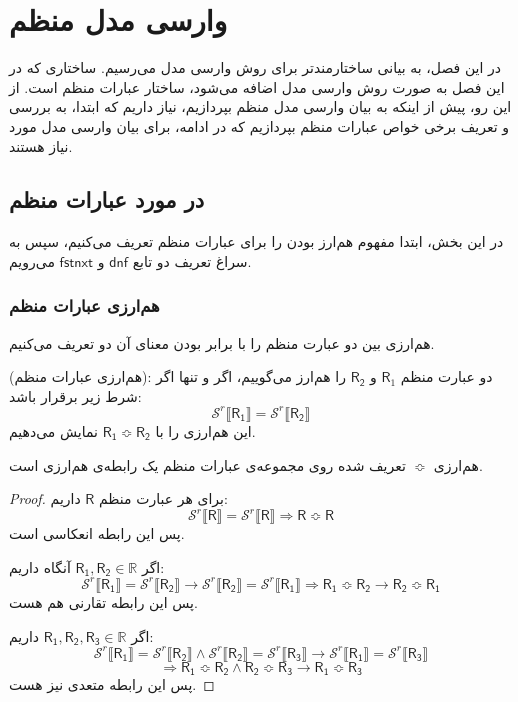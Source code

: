 \chapter{وارسی مدل منظم}
در این فصل، به بیانی ساختارمندتر برای روش وارسی مدل می‌رسیم. ساختاری که در این فصل به صورت روش وارسی مدل اضافه می‌شود، ساختار عبارات منظم است. از این رو، پیش از اینکه به بیان وارسی مدل منظم بپردازیم، نیاز داریم که ابتدا، به بررسی و تعریف برخی خواص عبارات منظم بپردازیم که در ادامه، برای بیان وارسی مدل مورد نیاز هستند.

\section{در مورد عبارات منظم}
در این بخش، ابتدا مفهوم هم‌ارز بودن را برای عبارات منظم تعریف می‌کنیم، سپس به سراغ تعریف دو تابع 
$\mathsf{dnf}$
و 
$\mathsf{fstnxt}$
می‌رویم. 
\subsection{هم‌ارزی عبارات منظم}
‌هم‌ارزی بین دو عبارت منظم را با برابر بودن معنای آن دو تعریف می‌کنیم.
\begin{defn}
	(هم‌ارزی عبارات منظم):
	دو عبارت منظم
	$\mathsf{R}_1$
	و
	$\mathsf{R_2}$
	 را هم‌ارز می‌گوییم، اگر و تنها اگر شرط زیر برقرار باشد:
	 $$\mathcal{S}^r \llbracket \mathsf{R_1} \rrbracket = \mathcal{S}^r \llbracket \mathsf{R_2} \rrbracket$$ 
	 این هم‌ارزی را با 
	 $\mathsf{R_1} \Bumpeq \mathsf{R_2}$
	 نمایش می‌دهیم.
\end{defn}

\begin{thm}
	هم‌ارزی $\Bumpeq$ تعریف شده روی مجموعه‌ی عبارات منظم یک رابطه‌ی هم‌ارزی است.
\end{thm}
\begin{proof}
	برای هر عبارت منظم $\mathsf{R}$ داریم:
	$$\mathcal{S}^r \llbracket \mathsf{R} \rrbracket = 
	\mathcal{S}^r \llbracket \mathsf{R} \rrbracket \Rightarrow
	\mathsf{R} \Bumpeq \mathsf{R}$$
	پس این رابطه انعکاسی است.
	
	اگر 
	$\mathsf{R_1 , R_2} \in \mathbb{R}$
	آنگاه داریم:
	$$\mathcal{S}^r \llbracket \mathsf{R_1} \rrbracket =
	\mathcal{S}^r \llbracket \mathsf{R_2} \rrbracket \rightarrow
	\mathcal{S}^r \llbracket \mathsf{R_2} \rrbracket =
	\mathcal{S}^r \llbracket \mathsf{R_1} \rrbracket \Rightarrow
	\mathsf{R_1} \Bumpeq \mathsf{R_2} \rightarrow
	\mathsf{R_2} \Bumpeq \mathsf{R_1}$$
	پس این رابطه تقارنی هم هست.
	
	اگر
	 $\mathsf{R_1,R_2,R_3} \in \mathbb{R}$
	 	داریم:
	 $$\mathcal{S}^r \llbracket \mathsf{R_1} \rrbracket =
	 \mathcal{S}^r \llbracket \mathsf{R_2} \rrbracket \land
	 \mathcal{S}^r \llbracket \mathsf{R_2} \rrbracket =
	 \mathcal{S}^r \llbracket \mathsf{R_3} \rrbracket \rightarrow
	 \mathcal{S}^r \llbracket \mathsf{R_1} \rrbracket =
	 \mathcal{S}^r \llbracket \mathsf{R_3} \rrbracket$$
	 $$\Rightarrow
	 \mathsf{R_1} \Bumpeq \mathsf{R_2} \land
	 \mathsf{R_2} \Bumpeq \mathsf{R_3} \rightarrow
	 \mathsf{R_1} \Bumpeq \mathsf{R_3}$$
	 پس این رابطه متعدی نیز هست.
\end{proof}


